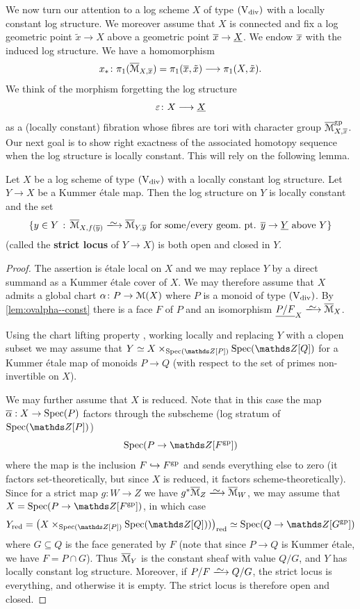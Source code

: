 We now turn our attention to a log scheme $X$ of type $(\mathrm{V}_{\rm div})$ with a locally constant log structure.
We moreover assume that $X$ is connected and fix a log geometric point $\tilde{x} \to X$ above a geometric point $\overline{x} \to \underline{X}$. We endow $\overline{x}$ with the induced log structure. We have a homomorphism
\[
     x_\ast \colon \pi_1(\overline{{\mathcal M}}_{X,\overline{x}}) = \pi_1(\overline{x},\tilde x) \longrightarrow \pi_1(X, \tilde x).
\]
We think of the morphism forgetting the log structure
\[
    \varepsilon\colon X \longrightarrow \underline{X}
\]
as a (locally constant) fibration whose fibres are tori with character group $\overline{{\mathcal M}}_{X,\overline{x}}^{\rm gp}$. Our next goal is to show right exactness of the associated homotopy sequence when the log structure is locally constant. This will rely on the following lemma. 

\begin{lem}
\label{lem:strict-locus-clopen}
    Let $X$ be a log scheme of type $(\mathrm{V}_{\rm div})$ with a locally constant log structure. Let $Y\to X$ be a Kummer \'etale map. Then the log structure on $Y$ is locally constant and the set 
    \[ 
        \{ y\in Y \,:\, \ov{\cM}_{X,f(\ov y)}\isomto \ov{\cM}_{Y,\ov y} \text{ for some/every geom.\ pt. $\ov y\to \underline{Y}$ above $Y$}\}
    \]
    (called the {\bf strict locus} of $Y\to X$) is both open and closed in $Y$.
\end{lem}

\begin{proof}
The assertion is \'etale local on $X$ and we may replace $Y$ by a direct summand as a Kummer \'etale cover of $X$. We may therefore assume that $X$ admits a global chart $\alpha \colon P \to {\mathcal M}(X)$ where $P$ is a monoid of type $(\mathrm{V}_{\rm div})$. By \cref{lem:ovalpha--const} there is a face $F$ of $P$ and an isomorphism $\underline{P/F}_X \isomto \overline{\cM}_X$.

Using the chart lifting property \cite[Proposition~3.5.8]{AHLS-Log}, working locally and replacing $Y$ with a clopen subset we may assume that $Y\simeq X\times_{\Spec(\bZ[P])}\Spec(\bZ[Q])$ for a Kummer \'etale map of monoids $P\to Q$ (with respect to the set of primes non-invertible on $X$). 

We may further assume that $X$ is reduced. Note that in this case the map $\overline{\alpha} : X \to \operatorname{Spec}(P)$ factors through the subscheme (log stratum of $\Spec(\bZ[P])$)
\[ 
    \Spec(P\to \bZ[F^\gp])
\]
where the map is the inclusion $F\hookrightarrow F^{\rm gp}$ and sends everything else to zero (it factors set-theoretically, but since $X$ is reduced, it factors scheme-theoretically). Since for a strict map $g\colon W\to Z$ we have $g^*\ov{\cM}_Z\isomto \ov{\cM}_W$, we may assume that $X = \Spec(P\to \bZ[F^\gp])$, in which case 
\[ 
    Y_{\rm red} = \left(X\times_{\Spec(\bZ[P])}\Spec(\bZ[Q]))\right)_{\rm red} \simeq \Spec(Q\to \bZ[G^\gp])
\]
where $G\subseteq Q$ is the face generated by $F$ (note that since $P\to Q$ is Kummer \'etale, we have $F = P\cap G$). Thus $\overline{{\mathcal M}}_Y$ is the constant sheaf with value $Q/G$, and $Y$ has locally constant log structure. Moreover, if $P/F\isomto Q/G$, the strict locus is everything, and otherwise it is empty. The strict locus is therefore open and closed.
\end{proof}

